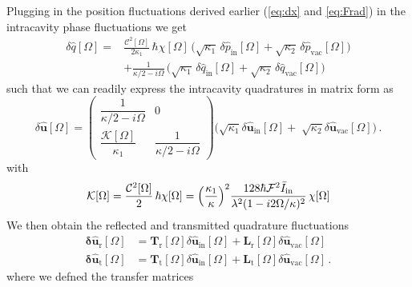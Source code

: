 Plugging in the position fluctuations derived earlier (\eqref{eq:dx} and \eqref{eq:Frad}) in the intracavity phase fluctuations we get
\begin{equation}
  \begin{split}
\delta \hat{q}[\Omega] =  &\frac{ \mathcal{C}^2[\Omega]}{2\kappa_1}  \,\hbar  \chi[\Omega] \, \bigg( \sqrt{\kappa_1} \, \delta \hat{p}_{\mathrm{in}}[\Omega] + \sqrt{\kappa_2} \, \delta \hat{p}_{\mathrm{vac}}[\Omega] \bigg) \\ 
 & +\frac{1}{\kappa/2 - i\Omega} \, \bigg( \sqrt{\kappa_1} \, \delta \hat{q}_{\mathrm{in}}[\Omega] + \sqrt{\kappa_2} \, \delta \hat{q}_{\mathrm{vac}}[\Omega] \bigg) 
  \end{split}
\end{equation}
such that we can readily express the intracavity quadratures in matrix form as
\begin{equation}
\delta\mathbf{\hat{\mathbf u}} [\Omega]
=
\left(
\begin{array}{cc}
\dfrac{1}{\kappa/2 - i\Omega} & 0\\[6pt]
\dfrac{\mathcal{K}[\Omega]}{\kappa_1} & \dfrac{1}{\kappa/2 - i\Omega}
\end{array}
\right)
\bigg( 
\sqrt{\kappa_1} \delta\mathbf{\hat{\mathbf u}} _{\mathrm{in}}[\Omega] +\;
\sqrt{\kappa_2} \delta\mathbf{\hat{\mathbf u}} _{\mathrm{vac}}[\Omega] \bigg)  \, .
\end{equation}
with
\begin{equation*}
  \mathcal{K}[\Omega] = \frac{ \mathcal{C}^2[\Omega]}{2}  \,\hbar  \chi[\Omega]= \Bigl(\dfrac{\kappa_{\mathrm{1}}}{\kappa}\Bigr)^2 \dfrac{128 \hbar \mathcal{F}^2 \bar I_{\rm in}}{\lambda^2(1 - i2\Omega/\kappa)^2}  \,  \chi[\Omega]
\end{equation*}
We then obtain the reflected and transmitted quadrature fluctuations 
\begin{equation}
\begin{split}
\mathbf{\delta \hat{u}_{\mathrm{r}}}[\Omega] &= 
\mathbf{T}_{\mathrm{r}}[\Omega]
\delta\hat{\mathbf u}_{\mathrm{in}}[\Omega] + 
\mathbf{L}_{\mathrm{r}}[\Omega]
\delta\hat{\mathbf u}_{\mathrm{vac}}[\Omega] \, \\ 
\mathbf{\delta \hat{u}_{\mathrm{t}}}[\Omega] &= \mathbf{T}_{\mathrm{t}}[\Omega]  \delta\hat{\mathbf u}_{\mathrm{in}}[\Omega] +
\mathbf{L}_{\mathrm{t}}[\Omega]
\delta\hat{\mathbf u}_{\mathrm{vac}}[\Omega] \, .
\end{split}
\end{equation}
 where we defned the transfer matrices 
